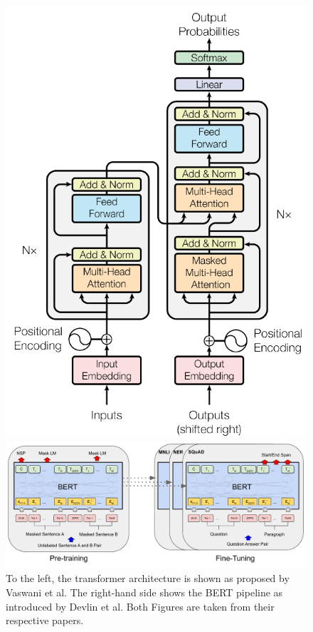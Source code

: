 \documentclass[main.tex]{subfiles}
\begin{document}
\begin{figure}[H]
    \centering
    \begin{minipage}{0.35\linewidth}
        \includegraphics[width=\linewidth]{imgs/transformer}
    \end{minipage}\hfill
    \begin{minipage}{0.64\linewidth}
        \includegraphics[width=\linewidth]{imgs/bert}
    \end{minipage}
    \caption{
        To the left, the transformer architecture is shown as proposed by Vaswani et al. \cite{vaswani2017att}
        The right-hand side shows the BERT pipeline as introduced by Devlin et al. \cite{devlin2019bert}
        Both Figures are taken from their respective papers.
    }
    \label{fig:transformer-bert}
\end{figure}\noindent
\end{document}
